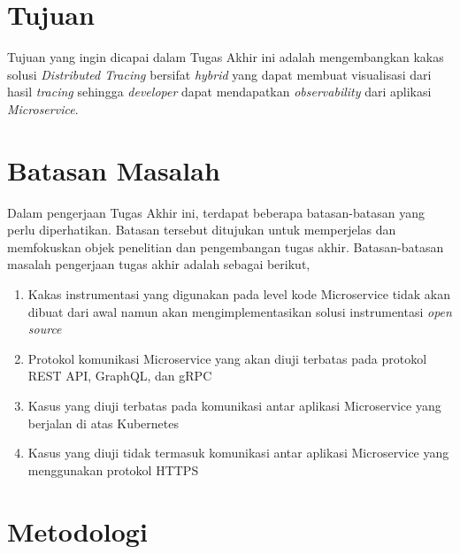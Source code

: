 \section{Tujuan}

Tujuan yang ingin dicapai dalam Tugas Akhir ini adalah mengembangkan kakas solusi \textit{Distributed Tracing} bersifat \textit{hybrid} yang dapat membuat visualisasi dari hasil \textit{tracing} sehingga \textit{developer} dapat mendapatkan \textit{observability} dari aplikasi \textit{Microservice}.

\section{Batasan Masalah}

Dalam pengerjaan Tugas Akhir ini, terdapat beberapa batasan-batasan yang perlu diperhatikan. Batasan tersebut ditujukan untuk memperjelas dan memfokuskan objek penelitian dan pengembangan tugas akhir. Batasan-batasan masalah pengerjaan tugas akhir adalah sebagai berikut,

\begin{enumerate}
	\item Kakas instrumentasi yang digunakan pada level kode Microservice tidak akan dibuat dari awal namun akan mengimplementasikan solusi instrumentasi \textit{open source}
	\item Protokol komunikasi Microservice yang akan diuji terbatas pada protokol REST API, GraphQL, dan gRPC
	\item Kasus yang diuji terbatas pada komunikasi antar aplikasi Microservice yang berjalan di atas Kubernetes
	\item Kasus yang diuji tidak termasuk komunikasi antar aplikasi Microservice yang menggunakan protokol HTTPS
\end{enumerate}

\section{Metodologi}

